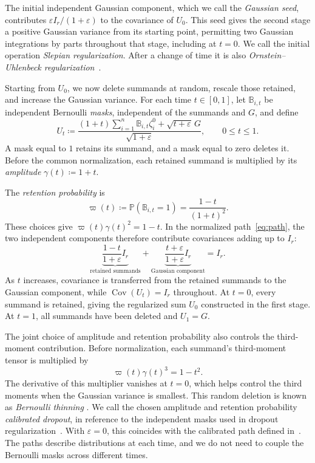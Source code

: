 \documentclass[11pt,letterpaper,twoside,leqno]{article}
\theoremstyle{bookplain}
\theoremstyle{bookremark}
\newcommand{\Pp}{\mathbb P}
\newcommand{\Cov}{\operatorname{Cov}}
\begin{document}
\begin{samepage}
{The initial independent Gaussian component, which we call the
\emph{Gaussian seed}, contributes \(\varepsilon I_r/(1+\varepsilon)\)
to the covariance of \(U_0\). This seed gives the second stage a positive
Gaussian variance from its starting point, permitting two Gaussian
integrations by parts throughout that stage, including at \(t=0\).
We call the initial operation \emph{Slepian regularization}.}
After a change of time it is also
\emph{Ornstein--Uhlenbeck regularization}~\cite[Theorem~4.12]{Nourdin2012}.
\par
\end{samepage}

{Starting from \(U_0\), we now delete summands at random,
rescale those retained, and increase the Gaussian variance.
For each time \(t\in[0,1]\), let \(\mathbb B_{i,t}\) be independent Bernoulli
\emph{masks}, independent of the summands and \(G\), and define}
\begin{equation}
 U_t\coloneqq
 \frac{(1+t)\sum_{i=1}^n\mathbb B_{i,t}\zeta_i^0
             +\sqrt{t+\varepsilon}\,G}{\sqrt{1+\varepsilon}},
 \qquad 0\le t\le1.
 \label{eq:path}
\end{equation}
A mask equal to \(1\) retains its summand, and a mask equal to zero deletes it.
Before the common normalization, each retained summand is multiplied by its
\emph{amplitude} \(\gamma(t)\coloneqq1+t\).

The \emph{retention probability} is
\[
 \varpi(t)\coloneqq\Pp(\mathbb B_{i,t}=1)
             =\frac{1-t}{(1+t)^2}.
\]
These choices give \(\varpi(t)\gamma(t)^2=1-t\). In the normalized
path~\eqref{eq:path}, the two independent components therefore contribute
{covariances adding up to \(I_r\):}
\[
 \underbrace{\frac{1-t}{1+\varepsilon}I_r}_{\text{retained summands}}
 +\underbrace{\frac{t+\varepsilon}{1+\varepsilon}I_r}_{\text{Gaussian component}}
 =I_r.
\]
As \(t\) increases, covariance is transferred from the retained summands
to the Gaussian component, while \(\Cov(U_t)=I_r\) throughout.
{At \(t=0\), every summand is retained, giving the regularized
sum \(U_0\) constructed in the first stage. At \(t=1\), all summands have
been deleted and \(U_1=G\).}

{The joint choice of amplitude and retention probability also
controls the third-moment contribution. Before normalization, each summand's
third-moment tensor is multiplied by}
\[
 {\varpi(t)\gamma(t)^3=1-t^2.}
\]
{The derivative of this multiplier vanishes at \(t=0\),
which helps control the third moments when the Gaussian variance is smallest.}
This random deletion is known as \emph{Bernoulli thinning}
\cite{Renyi1956,SteutelHarn1979,LastPenrose2017}. We call the
chosen amplitude and retention probability \emph{calibrated dropout},
in reference to the independent masks used in dropout regularization~\cite{Dropout2014}.
With \(\varepsilon=0\), this coincides with the calibrated path
defined in~\cite[Section~4]{AL}.
The paths describe distributions at each time, and
we do not need to couple the Bernoulli masks across different times.
\end{document}
